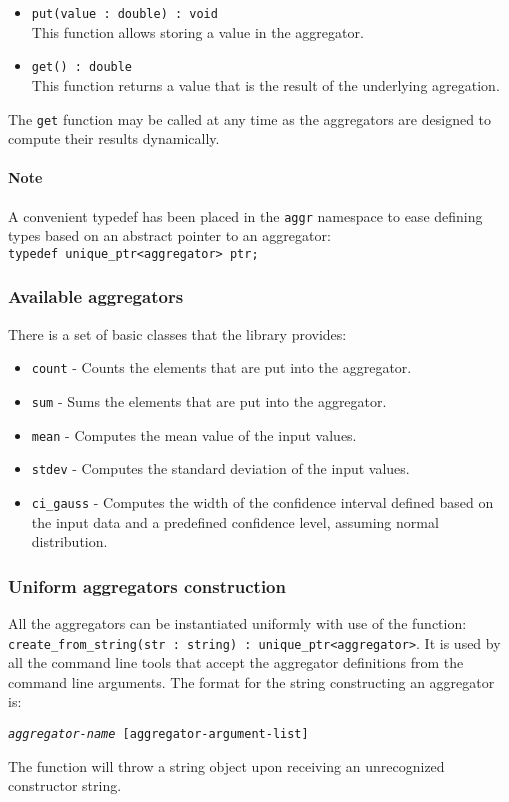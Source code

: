 \documentclass{report}
\begin{document}
	\begin{itemize}
		\item \texttt{put(value : double) : void}\\
			This function allows storing a value in the aggregator.
		\item \texttt{get() : double}\\
			This function returns a value that is the result of the
			underlying agregation.
	\end{itemize}

	The \texttt{get} function may be called at any time as the aggregators are
	designed to compute their results dynamically. 

	\paragraph{Note}
	A convenient typedef has been placed in the \texttt{aggr} namespace to ease
	defining types based on an abstract pointer to an aggregator:\\
	\texttt{typedef unique\_ptr<aggregator> ptr;}

	\subsubsection{Available aggregators}
	There is a set of basic classes that the library provides:

	\begin{itemize}
		\item \texttt{count} - Counts the elements that are put into the aggregator.
		\item \texttt{sum} - Sums the elements that are put into the aggregator.
		\item \texttt{mean} - Computes the mean value of the input values.
		\item \texttt{stdev} - Computes the standard deviation of the input values.
		\item \texttt{ci\_gauss} - Computes the width of the confidence
			interval defined based on the input data and a predefined
			confidence level, assuming normal distribution.
	\end{itemize}

	\subsubsection{Uniform aggregators construction}
	All the aggregators can be instantiated uniformly with use of the function:
	\texttt{create\_from\_string(str : string) : unique\_ptr<aggregator>}.
	It is used by all the command line tools that accept the aggregator definitions
	from the command line arguments. The format for the string constructing an
	aggregator is:
	\begin{center}
		\texttt{\textit{aggregator-name} [\texttt{aggregator-argument-list}]}
	\end{center}
	The function will throw a string object upon receiving an unrecognized constructor
	string.
\end{document}

